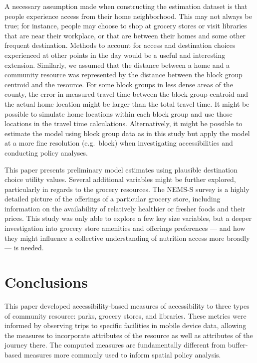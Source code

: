 \documentclass[3p, authoryear, review]{elsarticle} %
\begin{document}
A necessary assumption made when constructing the estimation dataset is that
people experience access from their home neighborhood. This may not always be true;
for instance, people may choose to shop at grocery stores or visit libraries that
are near their workplace, or that are between their homes and some other
frequent destination. Methods to account for access and destination choices
experienced at other points in the day would be a useful and interesting extension.
Similarly, we assumed that the distance between a home and a community resource
was represented by the distance between the block group centroid and the resource.
For some block groups in less dense areas of the county, the error in measured
travel time between the block group centroid and the actual home location might be
larger than the total travel time. It might be possible to simulate home locations
within each block group and use those locations in the travel time calculations.
Alternatively, it might be possible to estimate the model using block group data
as in this study but apply the model at a more fine resolution (e.g.~block) when
investigating accessibilities and conducting policy analyses.

This paper presents preliminary model estimates using plausible destination
choice utility values. Several additional variables might be further explored,
particularly in regards to the grocery resources. The NEMS-S survey is a highly
detailed picture of the offerings of a particular grocery store, including
information on the availability of relatively healthier or fresher foods and
their prices. This study was only able to explore a few key size variables, but
a deeper investigation into grocery store amenities and offerings
preferences --- and how they might influence a collective understanding of
nutrition access more broadly --- is needed.

\hypertarget{conclusions}{%
\section{Conclusions}\label{conclusions}}

This paper developed accessibility-based measures of accessibility to three
types of community resource: parks, grocery stores, and libraries. These metrics
were informed by observing trips to specific facilities in mobile
device data, allowing the measures to incorporate attributes of the resource
as well as attributes of the journey there. The computed measures are
fundamentally different from buffer-based measures more commonly used to
inform spatial policy analysis.
\end{document}
